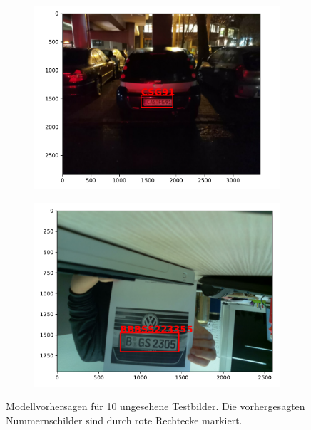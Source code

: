\begin{figure}
    \begin{subfigure}{0.31\textwidth}
        \includegraphics[width=\textwidth]{abbildungen/prediction_09.pdf}
    \end{subfigure}
    \begin{subfigure}{0.31\textwidth}
        \includegraphics[width=\textwidth]{abbildungen/prediction_10.pdf}
    \end{subfigure}
    \caption[Modellvorhersagen]{Modellvorhersagen f\"ur 10 ungesehene Testbilder.
        Die vorhergesagten Nummernschilder sind durch rote Rechtecke markiert.}
    \label{fig:modellvorhersagen}
\end{figure}
